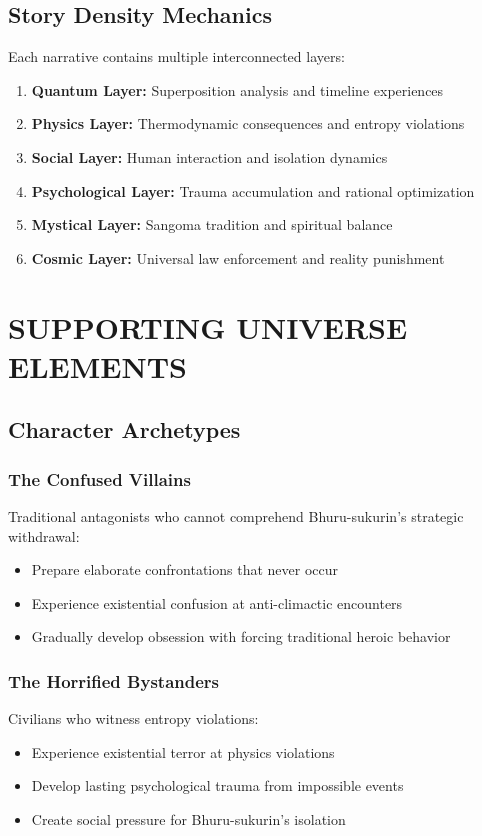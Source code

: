 \documentclass[12pt,a4paper]{article}
\begin{document}
\subsection{Story Density Mechanics}
Each narrative contains multiple interconnected layers:
\begin{enumerate}
\item \textbf{Quantum Layer:} Superposition analysis and timeline experiences
\item \textbf{Physics Layer:} Thermodynamic consequences and entropy violations
\item \textbf{Social Layer:} Human interaction and isolation dynamics
\item \textbf{Psychological Layer:} Trauma accumulation and rational optimization
\item \textbf{Mystical Layer:} Sangoma tradition and spiritual balance
\item \textbf{Cosmic Layer:} Universal law enforcement and reality punishment
\end{enumerate}

\section{SUPPORTING UNIVERSE ELEMENTS}

\subsection{Character Archetypes}

\subsubsection{The Confused Villains}
Traditional antagonists who cannot comprehend Bhuru-sukurin's strategic withdrawal:
\begin{itemize}
\item Prepare elaborate confrontations that never occur
\item Experience existential confusion at anti-climactic encounters
\item Gradually develop obsession with forcing traditional heroic behavior
\end{itemize}

\subsubsection{The Horrified Bystanders}
Civilians who witness entropy violations:
\begin{itemize}
\item Experience existential terror at physics violations
\item Develop lasting psychological trauma from impossible events
\item Create social pressure for Bhuru-sukurin's isolation
\end{itemize}
\end{document}
